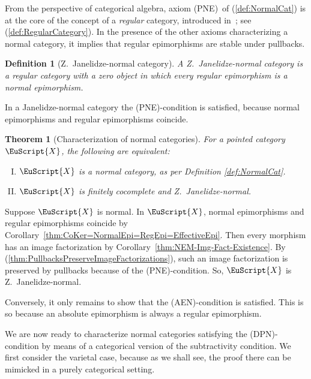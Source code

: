 \documentclass [12pt,oneside]{book}%
\makeatletter
\theoremstyle{captionstyle}  %
\newtheorem{theorem}[subsection]{Theorem}
\newtheorem{definition}[theorem]{Definition}
\renewenvironment{proof}[1][\proofname]{\vspace{-2ex}\par       %
	\pushQED{\qed}%
	\normalfont \topsep6\p@\@plus6\p@\relax
	\trivlist
	\item[\hskip\labelsep
	            \color{proofcaption}\bfseries                %
	            #1\@addpunct{\quad}]\ignorespaces
}{%
	\popQED\endtrivlist\@endpefalse
}
\newenvironment{tfae}{		%
	\begin{enumerate}[(I)]}{
	\end{enumerate}
}
\newcommand{\Defn}[1]{\emph{#1}}
\newcommand{\Ctgry}[1]{\EuScript{#1}}					%
\newcommand{\DPNInline}{(DPN)}																%
\newcommand{\PNEInline}{(PNE)}																%
\newcommand{\AENInline}{(AEN)}																%
\makeatother
\begin{document}
From the perspective of categorical algebra, axiom \PNEInline\ of (\ref{def:NormalCat}) is at the core of the concept of a \emph{regular} category, introduced in~\cite{Barr-Grillet-vanOsdol}; see (\ref{def:RegularCategory}). In the presence of the other axioms characterizing a normal category, it implies that regular epimorphisms are stable under pullbacks.

\begin{definition}[Z.~Janelidze-normal category]
    \label{def:JanNormalCat}%
    \cite{ZJanelidze-Subtractive}\quad A \Defn{Z.~Janelidze-normal category} is a regular category with a zero object in which every regular epimorphism is a normal epimorphism.%
\end{definition}

In a Janelidze-normal category the \PNEInline-condition is satisfied, because normal epimorphisms and regular epimorphisms coincide.

\begin{theorem}[Characterization of normal categories]
    \label{thm:CharNormalCat}%
    For  a pointed category $\Ctgry{X}$, the following are equivalent:
    \begin{tfae}
        \item $\Ctgry{X}$ is a normal category, as per Definition \ref{def:NormalCat}.
        \item $\Ctgry{X}$ is finitely cocomplete and Z.~Janelidze-normal.
    \end{tfae}
\end{theorem}
\begin{proof}
    Suppose $\Ctgry{X}$ is normal. In $\Ctgry{X}$, normal epimorphisms and regular epimorphisms coincide by Corollary~\ref{thm:CoKer=NormalEpi=RegEpi=EffectiveEpi}. Then every morphism has an image factorization by  Corollary~\ref{thm:NEM-Img-Fact-Existence}. By (\ref{thm:PullbacksPreserveImageFactorizations}), such an image factorization is preserved by pullbacks because of the \PNEInline-condition. So, $\Ctgry{X}$ is Z.~Janelidze-normal.

    Conversely, it only remains to show that the \AENInline-condition is satisfied. This is so because an absolute epimorphism is always a regular epimorphism.
\end{proof}

We are now ready to characterize normal categories satisfying the \DPNInline-condition by means of a categorical version of the subtractivity condition. We first consider the varietal case, because as we shall see, the proof there can be mimicked in a purely categorical setting.
\end{document}
